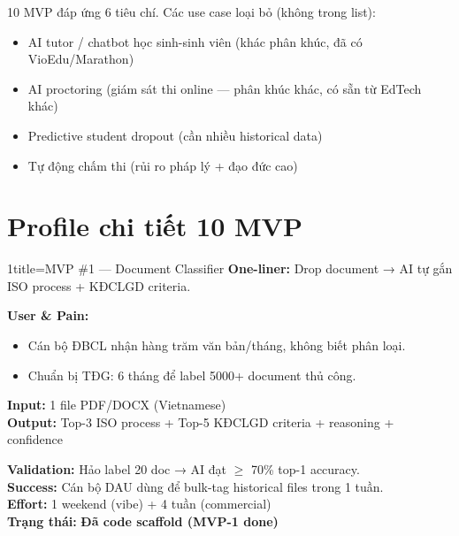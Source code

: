 \documentclass[11pt,a4paper]{article}
\begin{document}
10 MVP đáp ứng 6 tiêu chí. Các use case loại bỏ (không trong list):
\begin{itemize}
\item AI tutor / chatbot học sinh-sinh viên (khác phân khúc, đã có VioEdu/Marathon)
\item AI proctoring (giám sát thi online — phân khúc khác, có sẵn từ EdTech khác)
\item Predictive student dropout (cần nhiều historical data)
\item Tự động chấm thi (rủi ro pháp lý + đạo đức cao)
\end{itemize}

\clearpage

\section{Profile chi tiết 10 MVP}

\begin{mvpbox}{1}{title=MVP \#1 — Document Classifier}
\textbf{One-liner:} Drop document → AI tự gắn ISO process + KĐCLGD criteria.

\textbf{User \& Pain:}
\begin{itemize}
\item Cán bộ ĐBCL nhận hàng trăm văn bản/tháng, không biết phân loại.
\item Chuẩn bị TĐG: 6 tháng để label 5000+ document thủ công.
\end{itemize}

\textbf{Input:} 1 file PDF/DOCX (Vietnamese)\\
\textbf{Output:} Top-3 ISO process + Top-5 KĐCLGD criteria + reasoning + confidence

\textbf{Validation:} Hảo label 20 doc → AI đạt $\geq$ 70\% top-1 accuracy.\\
\textbf{Success:} Cán bộ DAU dùng để bulk-tag historical files trong 1 tuần.\\
\textbf{Effort:} 1 weekend (vibe) + 4 tuần (commercial)\\
\textbf{Trạng thái:} \textcolor{ok}{\textbf{Đã code scaffold (MVP-1 done)}}
\end{mvpbox}
\end{document}
